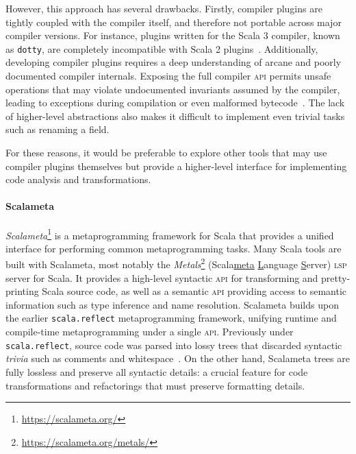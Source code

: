 \documentclass[../../main.tex]{subfiles}
\begin{document}
However, this approach has several drawbacks.
Firstly, compiler plugins are tightly coupled with the compiler itself, and therefore not portable across major compiler versions.
For instance, plugins written for the Scala 3 compiler, known as \texttt{dotty}, are completely incompatible with Scala 2 plugins~\cite{lampepfl_changes_2022}.
Additionally, developing compiler plugins requires a deep understanding of arcane and poorly documented compiler internals.
Exposing the full compiler \textsc{api} permits unsafe operations that may violate undocumented invariants assumed by the compiler, leading to exceptions during compilation or even malformed bytecode~\cite{sherwany_refactoring_2015}.
The lack of higher-level abstractions also makes it difficult to implement even trivial tasks such as renaming a field.

For these reasons, it would be preferable to explore other tools that may use compiler plugins themselves but provide a higher-level interface for implementing code analysis and transformations.

\paragraph{Scalameta}
\textit{Scalameta}\footnote{\url{https://scalameta.org/}} is a metaprogramming framework for Scala that provides a unified interface for performing common metaprogramming tasks.
Many Scala tools are built with Scalameta, most notably the \emph{Metals}\footnote{\url{https://scalameta.org/metals/}} (Scala\underline{meta} \underline{L}anguage \underline{S}erver) \textsc{lsp} server for Scala. %
It provides a high-level syntactic \textsc{api} for transforming and pretty-printing Scala source code, as well as a semantic \textsc{api} providing access to semantic information such as type inference and name resolution.
Scalameta builds upon the earlier \texttt{scala.reflect} metaprogramming framework, unifying runtime and compile-time metaprogramming under a single \textsc{api}.
Previously under \texttt{scala.reflect}, source code was parsed into lossy trees that discarded syntactic \emph{trivia} such as comments and whitespace~\cite{burmako_scalameta_2017}.
On the other hand, Scalameta trees are fully lossless and preserve all syntactic details: a crucial feature for code transformations and refactorings that must preserve formatting details.
\end{document}
